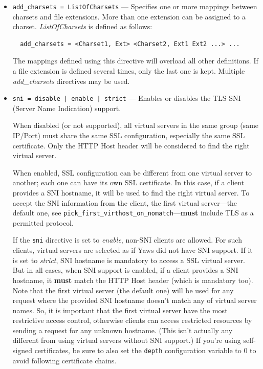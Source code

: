 \documentclass[11pt,oneside,english]{book}
\begin{document}
\begin{itemize}
\item        \verb+add_charsets = ListOfCharsets+ ---
              Specifies one or more mappings between charsets and file
              extensions. More than one extension can be assigned to a
              charset. \textit{ListOfCharsets} is defined as follows:
\begin{verbatim}
  add_charsets = <Charset1, Ext> <Charset2, Ext1 Ext2 ...> ...
\end{verbatim}
              The mappings defined using this directive will overload all other
              definitions. If a file extension is defined several times, only
              the last one is kept. Multiple \textit{add\_charsets} directives
              may be used.

\item        \verb+sni = disable | enable | strict+ ---
              Enables or disables the TLS SNI (Server Name Indication) support.

              When disabled (or not supported), all virtual servers in the same
              group (same IP/Port) must share the same SSL configuration,
              especially the same SSL certificate. Only the HTTP Host header
              will be considered to find the right virtual server.

              When enabled, SSL configuration can be different from one virtual
              server to another; each one can have its own SSL certificate. In
              this case, if a client provides a SNI hostname, it will be used to
              find the right virtual server. To accept the SNI information from
              the client, the first virtual server---the default one, see
              \verb+pick_first_virthost_on_nomatch+---\textbf{must} include
              TLS as a permitted protocol.

              If the \verb+sni+ directive is set to \textit{enable}, non-SNI clients
              are allowed. For such clients, virtual servers are selected as if
              Yaws did not have SNI support. If it is set to \textit{strict},
              SNI hostname is mandatory to access a SSL virtual server. But in
              all cases, when SNI support is enabled, if a client provides a SNI
              hostname, it \textbf{must} match the HTTP Host header (which is
              mandatory too). Note that the first virtual server (the default
              one) will be used for any request where the provided SNI hostname
              doesn't match any of virtual server names. So, it is important
              that the first virtual server have the most restrictive access
              control, otherwise clients can access restricted resources by
              sending a request for any unknown hostname. (This isn't actually
              any different from using virtual servers without SNI support.) If
              you're using self-signed certificates, be sure to also set the
              \verb+depth+ configuration variable to 0 to avoid following
              certificate chains.


\end{itemize}
\end{document}

